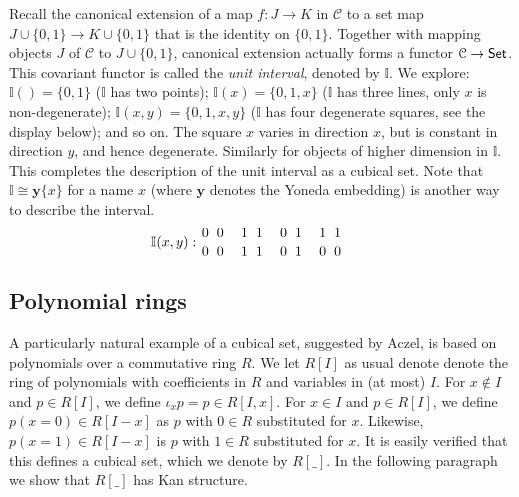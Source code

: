 \documentclass[a4paper,USenglish,draft]{lipics}
\newcommand{\CC}{{\mathcal C}}
\newcommand{\yoneda}{\mathbf{y}}
\newcommand{\interval}{\mathbb{I}}
\newcommand{\set}[1]{\{#1\}}
\begin{document}
Recall the canonical extension of a map $f:J\to K$ in $\CC$ to a set
map $J \cup \set{0,1} \to K\cup \set{0,1}$ that is the identity on
$\set{0,1}$.  Together with mapping objects $J$ of $\CC$ to $J \cup
\set{0,1}$, canonical extension actually forms a functor $\CC\to{\sf
  Set}$.  This covariant functor is called the \emph{unit interval},
denoted by $\interval$.  We explore: $\interval()=\set{0,1}$
($\interval$ has two points); $\interval(x)=\set{0,1,x}$ ($\interval$
has three lines, only $x$ is non-degenerate); $\interval(x,y) =
\set{0,1,x,y}$ ($\interval$ has four degenerate squares, see the
display below); and so on.  The square $x$ varies in direction $x$,
but is constant in direction $y$, and hence degenerate.  Similarly
for objects of higher dimension in $\interval$.  This completes the
description of the unit interval as a cubical set.  Note that
$\interval \cong \yoneda \set{x}$ for a name $x$ (where $\yoneda$
denotes the Yoneda embedding) is another way to describe the interval.
\def\olll{{1 \atop 0} ~ {1 \atop 1}}
\def\oool{{0 \atop 0} ~ {1 \atop 0}}
\def\oooo{{0 \atop 0} ~ {0 \atop 0}}
\def\llll{{1 \atop 1} ~ {1 \atop 1}}
\def\olol{{1 \atop 0} ~ {1 \atop 0}}
\def\ooll{{0 \atop 0} ~ {1 \atop 1}}
\def\Fxy{{0 \atop 0} ~ {0 \atop 0}}
\def\Txy{{1 \atop 1} ~ {1 \atop 1}}
\def\Iy{{1 \atop 0} ~ {1 \atop 0}}
\def\Ix{{0 \atop 0} ~ {1 \atop 1}}
\[
\interval(x,y):\Fxy\quad\Txy\quad\Ix\quad\Iy\quad\quad
\]

\subsection{Polynomial rings}
\label{sec:polyrings}

A particularly natural example of a cubical set, suggested by Aczel,
is based on polynomials over a commutative ring $R$.  We let $R[I]$ as
usual denote denote the ring of polynomials with coefficients in $R$
and variables in (at most) $I$. For $x\notin I$ and $p\in R[I]$, we
define $\iota_x p = p \in R[I,x]$. For $x\in I$ and $p\in R[I]$, we
define $p(x=0) \in R[I-x]$ as $p$ with $0\in R$ substituted for
$x$. Likewise, $p(x=1) \in R[I-x]$ is $p$ with $1\in R$ substituted
for $x$. It is easily verified that this defines a cubical set, which
we denote by $R[\_]$. In the following paragraph we show that $R[\_]$
has Kan structure.
\end{document}
